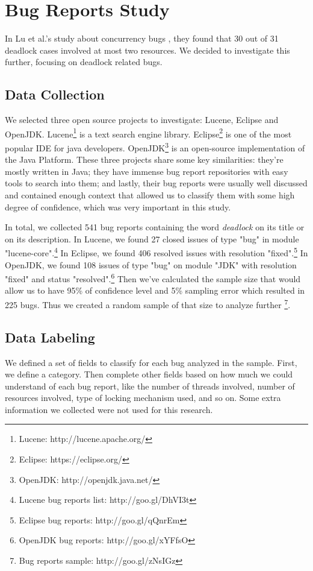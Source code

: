 \section{Bug Reports Study}

In Lu et al.'s study about concurrency bugs \cite{lu}, they found that 30 out of 31 deadlock cases involved at most two resources. We decided to investigate this further, focusing on deadlock related bugs.

\subsection{Data Collection}

We selected three open source projects to investigate: Lucene, Eclipse and OpenJDK. Lucene\footnote{Lucene: http://lucene.apache.org/} is a text search engine library. Eclipse\footnote{Eclipse: https://eclipse.org/} is one of the most popular IDE for java developers. OpenJDK\footnote{OpenJDK: http://openjdk.java.net/} is an open-source implementation of the Java Platform. These three projects share some key similarities: they're mostly written in Java; they have immense bug report repositories with easy tools to search into them; and lastly, their bug reports were usually well discussed and contained enough context that allowed us to classify them with some high degree of confidence, which was very important in this study.

In total, we collected 541 bug reports containing the word \emph{deadlock} on its title or on its description. In Lucene, we found 27 closed issues of type "bug" in module "lucene-core".\footnote{Lucene bug reports list: http://goo.gl/DhVI3t}
In Eclipse, we found 406 resolved issues with resolution "fixed".\footnote{Eclipse bug reports: http://goo.gl/qQnrEm}
In OpenJDK, we found 108 issues of type "bug" on module "JDK" with resolution "fixed" and status "resolved".\footnote{OpenJDK bug reports: http://goo.gl/xYFfsO} Then we've calculated the sample size that would allow us to have 95\% of confidence level and 5\% sampling error which resulted in 225 bugs. Thus we created a random sample of that size to analyze further \footnote{Bug reports sample: http://goo.gl/zNsIGz}.

\subsection{Data Labeling}

We defined a set of fields to classify for each bug analyzed in the sample. First, we define a category. Then complete other fields based on how much we could understand of each bug report, like the number of threads involved, number of resources involved, type of locking mechanism used, and so on. Some extra information we collected were not used for this research.

